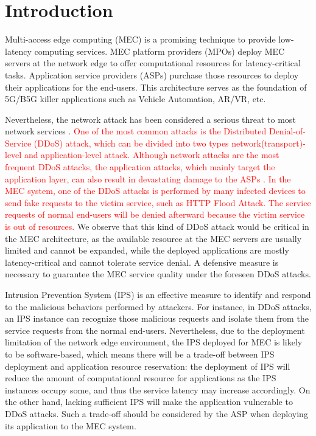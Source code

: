 \documentclass[10pt,journal, compsoc]{IEEEtran}
\begin{document}
%
\IEEEpeerreviewmaketitle
\section{Introduction}
Multi-access edge computing (MEC) is a promising technique to provide low-latency computing services. MEC platform providers (MPOs) deploy MEC servers at the network edge to offer computational resources for latency-critical tasks. Application service providers (ASPs) purchase those resources to deploy their applications for the end-users. This architecture serves as the foundation of 5G/B5G killer applications such as Vehicle Automation, AR/VR, etc.

Nevertheless, the network attack has been considered a serious threat to most network services \cite{Singh}. \textcolor{red}{One of the most common attacks is the Distributed Denial-of-Service (DDoS) attack, which can be divided into two types network(transport)-level and application-level attack\cite{Zargar}. Although network attacks are the most frequent DDoS attacks, the application attacks, which mainly target the application layer, can also result in devastating damage to the ASPs \cite{Praseed}. In the MEC system, one of the DDoS attacks is performed by many infected devices to send fake requests to the victim service, such as HTTP Flood Attack. The service requests of normal end-users will be denied afterward because the victim service is out of resources.} We observe that this kind of DDoS attack would be critical in the MEC architecture, as the available resource at the MEC servers are usually limited and cannot be expanded, while the deployed applications are mostly latency-critical and cannot tolerate service denial. A defensive measure is necessary to guarantee the MEC service quality under the foreseen DDoS attacks\cite{Tripathi}\cite{Agrawal}.

Intrusion Prevention System (IPS) is an effective measure to identify and respond to the malicious behaviors performed by attackers\cite{Nadeem}. For instance, in DDoS attacks, an IPS instance can recognize those malicious requests and isolate them from the service requests from the normal end-users\cite{Siregar}. Nevertheless, due to the deployment limitation of the network edge environment, the IPS deployed for MEC is likely to be software-based, which means there will be a trade-off between IPS deployment and application resource reservation: the deployment of IPS will reduce the amount of computational resource for applications as the IPS instances occupy some, and thus the service latency may increase accordingly. On the other hand, lacking sufficient IPS will make the application vulnerable to DDoS attacks. Such a trade-off should be considered by the ASP when deploying its application to the MEC system. 
\end{document}
